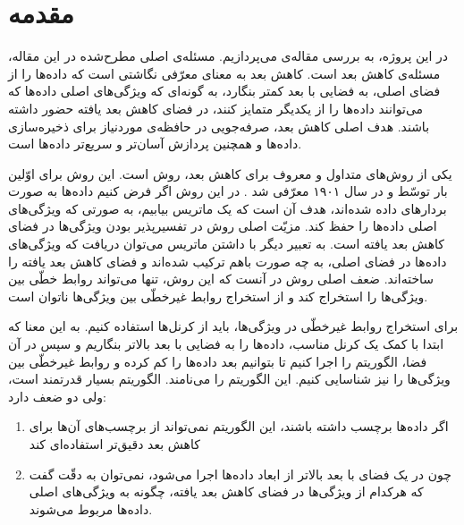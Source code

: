 \chapter{مقدمه}
در این پروژه، به بررسی مقاله‌ی 
\cite{NIPS2019_9005}
می‌پردازیم.
مسئله‌ی اصلی مطرح‌شده در این مقاله، مسئله‌ی کاهش بعد است. کاهش بعد به معنای معرّفی نگاشتی است که داده‌ها را از فضای اصلی، به فضایی با بعد کمتر بنگارد، به گونه‌ای که ویژگی‌های اصلی داده‌ها که می‌توانند داده‌ها را از یکدیگر متمایز کنند، در فضای کاهش بعد یافته حضور داشته باشند. هدف اصلی کاهش بعد، صرفه‌جویی در حافظه‌ی موردنیاز برای ذخیره‌سازی داده‌ها و همچنین پردازش آسان‌تر و سریع‌تر داده‌ها است.

یکی از روش‌های متداول و معروف برای کاهش بعد، روش 
است. این روش برای اوّلین بار توسّط 
و در سال ۱۹۰۱ معرّفی شد
\cite{karl1901liii}.
در این روش اگر فرض کنیم داده‌ها به صورت بردارهای 
داده شده‌اند، هدف آن است که یک ماتریس
بیابیم، به صورتی که 
ویژگی‌های اصلی داده‌ها را حفظ کند. مزیّت اصلی روش 
در تفسیرپذیر 
بودن ویژگی‌ها در فضای کاهش بعد یافته است. به تعبیر دیگر با داشتن ماتریس 
می‌توان دریافت که ویژگی‌های داده‌ها در فضای اصلی، به چه صورت باهم ترکیب شده‌اند و فضای کاهش بعد یافته را ساخته‌اند. ضعف اصلی روش
در آنست که این روش، تنها می‌تواند روابط خطّی بین ویژگی‌ها را استخراج کند و از استخراج روابط غیرخطّی بین ویژگی‌ها ناتوان است.

برای استخراج روابط غیرخطّی در ویژگی‌ها، باید از کرنل‌ها استفاده کنیم. به این معنا که ابتدا با کمک یک کرنل مناسب، داده‌ها را به فضایی با بعد بالاتر بنگاریم و سپس در آن فضا، الگوریتم 
را اجرا کنیم تا بتوانیم بعد داده‌ها را کم کرده و روابط غیرخطّی بین ویژگی‌ها را نیز شناسایی کنیم. 
\cite{scholkopf1997kernel}
این الگوریتم را 
می‌نامند. 
\cite{scholkopf1998nonlinear,barshan2011supervised}
الگوریتم 
بسیار قدرتمند است، ولی دو ضعف دارد:
\begin{enumerate}
	\item 
	اگر داده‌ها برچسب داشته باشند، این الگوریتم نمی‌تواند از برچسب‌های آن‌ها برای کاهش بعد دقیق‌تر استفاده‌ای کند
	\item 
	چون 
	در یک فضای با بعد بالاتر از ابعاد داده‌ها اجرا می‌شود، نمی‌توان به دقّت گفت که هرکدام از ویژگی‌ها در فضای کاهش بعد یافته، چگونه به ویژگی‌های اصلی داده‌ها مربوط می‌شوند. 
\end{enumerate}

